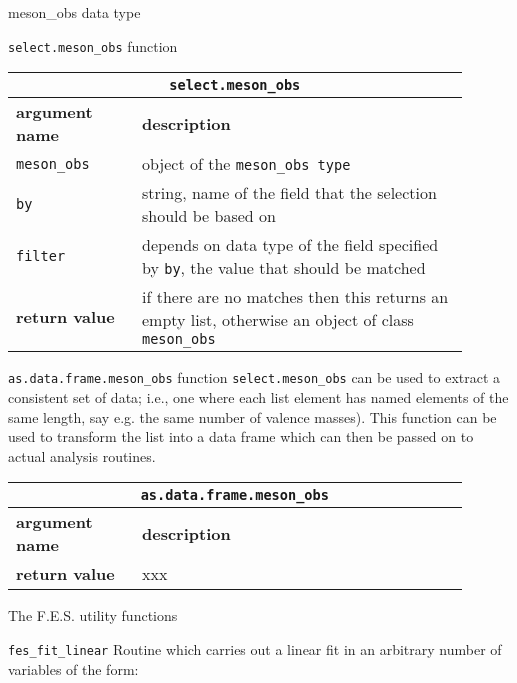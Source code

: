 \documentclass[10pt,a4paper]{article}
\begin{document}
\begin{section}{{\ttfamily meson\_obs} data type}
\begin{subsection}{{\tt select.meson\_obs} function}
\begin{table}[h]
\begin{tabular}{|p{0.25\linewidth}|p{0.65\linewidth}|}
\hline
\multicolumn{2}{|c|}{ {\tt select.meson\_obs} } \\
\hline \hline \textbf{argument name} & \textbf{description} \\
\hline {\tt meson\_obs} & object of the {\tt meson\_obs type} \\ 
{\tt by} & string, name of the field that the selection should be based on \\ 
{\tt filter} & depends on data type of the field specified by {\tt by}, the value that should be matched \\ 
\hline \hline
\textbf{return value} & if there are no matches then this returns an empty list, otherwise an object of class {\tt meson\_obs} \\
\hline
\end{tabular}
\end{table}

\end{subsection}

\begin{subsection}{ {\tt as.data.frame.meson\_obs} function }
{\tt select.meson\_obs} can be used to extract a consistent set of data; i.e., one where each list element has named elements of the same length, say e.g. the same number of valence masses).
This function can be used to transform the list into a data frame which can then be passed on to actual analysis routines.

\begin{table}[h]
\begin{tabular}{|p{0.25\linewidth}|p{0.65\linewidth}|}
\hline
\multicolumn{2}{|c|}{ {\tt as.data.frame.meson\_obs} } \\
\hline \hline \textbf{argument name} & \textbf{description} \\ \hline
\hline 
\textbf{return value} & xxx \\
\hline
\end{tabular}
\end{table}

\end{subsection}

\begin{section}{The F.E.S. utility functions}
\begin{subsection}{ {\tt fes\_fit\_linear} }
Routine which carries out a linear fit in an arbitrary number of variables of the form:


\end{subsection}
\end{section}
\end{section}
\end{document}
